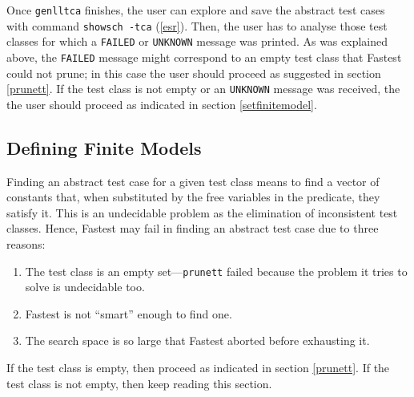 Once \verb+genlltca+ finishes, the user can explore and save the abstract test cases with command \verb+showsch -tca+ (\ref{esr}). Then, the user has to analyse those test classes for which a \verb+FAILED+ or \verb+UNKNOWN+ message was printed. As was explained above, the \verb+FAILED+ message might correspond to an empty test class that Fastest could not prune; in this case the user should proceed as suggested in section \ref{prunett}. If the test class is not empty or an \verb+UNKNOWN+ message was received, the the user should proceed as indicated in section \ref{setfinitemodel}.


\subsection{\label{setfinitemodel}Defining Finite Models}



Finding an abstract test case for a given test class means to find a vector of constants that, when substituted by the free variables in the predicate, they satisfy it. This is an undecidable problem as the elimination of inconsistent test classes. Hence, Fastest may fail in finding an abstract test case due to three reasons:

\begin{enumerate}
\item The test class is an empty set---\verb+prunett+ failed because the problem it tries to solve is undecidable too.

\item Fastest is not ``smart'' enough to find one.

\item The search space is so large that Fastest aborted before exhausting it.
\end{enumerate}

If the test class is empty, then proceed as indicated in section \ref{prunett}. If the test class is not empty, then keep reading this section. 

